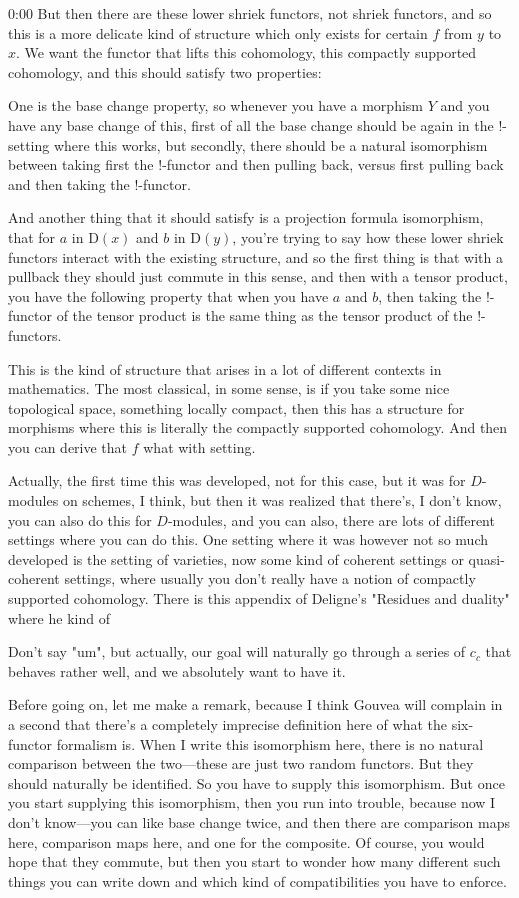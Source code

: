 \begin{unfinished}{0:00}
But then there are these lower shriek functors, not shriek functors, and so this is a more delicate kind of structure which only exists for certain $f$ from $y$ to $x$. We want the functor that lifts this cohomology, this compactly supported cohomology, and this should satisfy two properties:

One is the base change property, so whenever you have a morphism $Y$ and you have any base change of this, first of all the base change should be again in the $!$-setting where this works, but secondly, there should be a natural isomorphism between taking first the $!$-functor and then pulling back, versus first pulling back and then taking the $!$-functor.

And another thing that it should satisfy is a projection formula isomorphism, that for $a$ in $\mathrm{D}(x)$ and $b$ in $\mathrm{D}(y)$, you're trying to say how these lower shriek functors interact with the existing structure, and so the first thing is that with a pullback they should just commute in this sense, and then with a tensor product, you have the following property that when you have $a$ and $b$, then taking the $!$-functor of the tensor product is the same thing as the tensor product of the $!$-functors.

This is the kind of structure that arises in a lot of different contexts in mathematics. The most classical, in some sense, is if you take some nice topological space, something locally compact, then this has a structure for morphisms where this is literally the compactly supported cohomology. And then you can derive that $f$ what with setting.

Actually, the first time this was developed, not for this case, but it was for $\mathit{D}$-modules on schemes, I think, but then it was realized that there's, I don't know, you can also do this for $\mathit{D}$-modules, and you can also, there are lots of different settings where you can do this. One setting where it was however not so much developed is the setting of varieties, now some kind of coherent settings or quasi-coherent settings, where usually you don't really have a notion of compactly supported cohomology. There is this appendix of Deligne's "Residues and duality" where he kind of

Don't say "um", but actually, our goal will naturally go through a series of $c_{c}$ that behaves rather well, and we absolutely want to have it.

Before going on, let me make a remark, because I think Gouvea will complain in a second that there's a completely imprecise definition here of what the six-functor formalism is. When I write this isomorphism here, there is no natural comparison between the two---these are just two random functors. But they should naturally be identified. So you have to supply this isomorphism. But once you start supplying this isomorphism, then you run into trouble, because now I don't know---you can like base change twice, and then there are comparison maps here, comparison maps here, and one for the composite. Of course, you would hope that they commute, but then you start to wonder how many different such things you can write down and which kind of compatibilities you have to enforce.


\end{unfinished}
